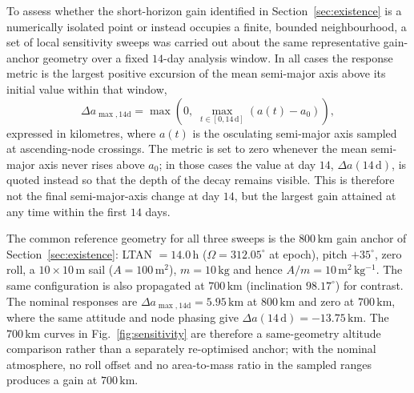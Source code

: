 \FloatBarrier
\noindent To assess whether the short-horizon gain identified in Section~\ref{sec:existence} is a numerically isolated point or instead occupies a finite, bounded neighbourhood, a set of local sensitivity sweeps was carried out about the same representative gain-anchor geometry over a fixed \(14\)-day analysis window. In all cases the response metric is the largest positive excursion of the mean semi-major axis above its initial value within that window,
\begin{equation}
\Delta a_{\max,14\mathrm{d}} = \max\left(0,\;\max_{t \in [0,14\,\mathrm{d}]} \left(a(t)-a_0\right)\right),
\end{equation}
expressed in kilometres, where \(a(t)\) is the osculating semi-major axis sampled at ascending-node crossings. The metric is set to zero whenever the mean semi-major axis never rises above \(a_0\); in those cases the value at day \(14\), \(\Delta a(14\,\mathrm{d})\), is quoted instead so that the depth of the decay remains visible. This is therefore not the final semi-major-axis change at day \(14\), but the largest gain attained at any time within the first \(14\) days.
\vspace{5pt}
\par\noindent The common reference geometry for all three sweeps is the \(800\,\mathrm{km}\) gain anchor of Section~\ref{sec:existence}: LTAN \(=14.0\,\mathrm{h}\) (\(\Omega = 312.05^\circ\) at epoch), pitch \(+35^\circ\), zero roll, a \(10\times10\,\mathrm{m}\) sail (\(A = 100\,\mathrm{m^2}\)), \(m = 10\,\mathrm{kg}\) and hence \(A/m = 10\,\mathrm{m^2\,kg^{-1}}\). The same configuration is also propagated at \(700\,\mathrm{km}\) (inclination \(98.17^\circ\)) for contrast. The nominal responses are \(\Delta a_{\max,14\mathrm{d}} = 5.95\,\mathrm{km}\) at \(800\,\mathrm{km}\) and zero at \(700\,\mathrm{km}\), where the same attitude and node phasing give \(\Delta a(14\,\mathrm{d}) = -13.75\,\mathrm{km}\). The \(700\,\mathrm{km}\) curves in Fig.~\ref{fig:sensitivity} are therefore a same-geometry altitude comparison rather than a separately re-optimised anchor; with the nominal atmosphere, no roll offset and no area-to-mass ratio in the sampled ranges produces a gain at \(700\,\mathrm{km}\).

